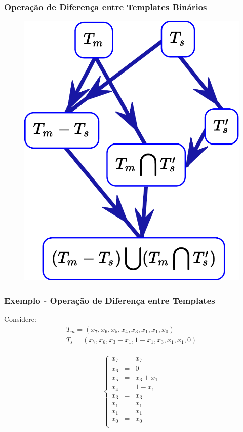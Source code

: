 \documentclass[aspectratio=43,hyperref={pdfpagelabels=false}]{beamer}
\begin{document}
  \begin{frame}
    \frametitle{Operação de Diferença entre Templates Binários}
    \begin{figure}[h!]
      \centering
      \includegraphics[width=.4\textwidth]{grafico2.pdf}
    \end{figure}
 \end{frame}

 \begin{frame}
    \frametitle{Exemplo - Operação de Diferença entre Templates}
    Considere:
    \begin{equation*}
    \begin{split}
    T_m = (x_7, x_6, x_5, x_4, x_3, x_1, x_1, x_0) \\
    T_s = (x_7, x_6, x_3 + x_1, 1 - x_1, x_3, x_1, x_1, 0)\\
    \end{split}
    \end{equation*}

    \begin{equation}
    \left\{\begin{matrix}
    x_7 & = & x_7 \\ 
    x_6 & = & 0 \\ 
    x_5 & = & x_3 + x_1 \\ 
    x_4 & = & 1 - x_1 \\ 
    x_3 & = & x_3 \\ 
    x_1 & = & x_1 \\ 
    x_1 & = & x_1 \\ 
    x_0 & = & x_0\\
    \end{matrix}\right.
    \end{equation}
\end{frame}
\end{document}
